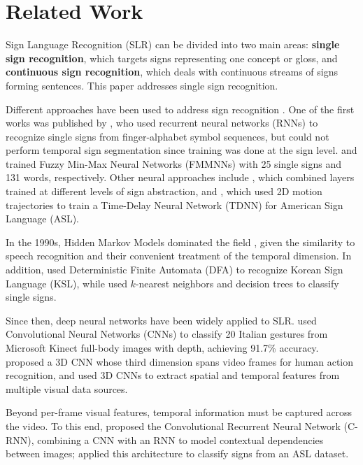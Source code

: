 \documentclass{article}
\begin{document}
\section{Related Work}
\label{section:related}
Sign Language Recognition (SLR) can be divided into two main areas: \textbf{single sign recognition}, which targets signs representing one concept or gloss, and \textbf{continuous sign recognition}, which deals with continuous streams of signs forming sentences. This paper addresses single sign recognition.

Different approaches have been used to address sign recognition \cite{cooper2011sign}. One of the first works was published by \cite{murakami1991gesture}, who used recurrent neural networks (RNNs) to recognize single signs from finger-alphabet symbol sequences, but could not perform temporal sign segmentation since training was done at the sign level. \cite{kim1996dynamic} and \cite{lee1997real} trained Fuzzy Min-Max Neural Networks (FMMNNs) with 25 single signs and 131 words, respectively. Other neural approaches include \cite{waldron1995isolated}, which combined layers trained at different levels of sign abstraction, and \cite{yang2002extraction}, which used 2D motion trajectories to train a Time-Delay Neural Network (TDNN) for American Sign Language (ASL).

In the 1990s, Hidden Markov Models dominated the field \cite{starner1997real,grobel1997isolated}, given the similarity to speech recognition and their convenient treatment of the temporal dimension. In addition, \cite{kim2001continuous} used Deterministic Finite Automata (DFA) to recognize Korean Sign Language (KSL), while \cite{kadous1996machine} used $k$-nearest neighbors and decision trees to classify single signs.

Since then, deep neural networks have been widely applied to SLR. \cite{pigou2014sign} used Convolutional Neural Networks (CNNs) to classify 20 Italian gestures from Microsoft Kinect full-body images with depth, achieving 91.7\% accuracy. \cite{jhuang2007biologically} proposed a 3D CNN whose third dimension spans video frames for human action recognition, and \cite{huang2015sign} used 3D CNNs to extract spatial and temporal features from multiple visual data sources.

Beyond per-frame visual features, temporal information must be captured across the video. To this end, \cite{zuo2015convolutional} proposed the Convolutional Recurrent Neural Network (C-RNN), combining a CNN with an RNN to model contextual dependencies between images; \cite{bantupalli2018american} applied this architecture to classify signs from an ASL dataset.
\end{document}
